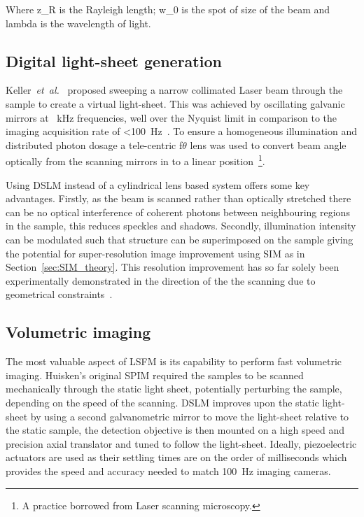 Where \gls{z_R} is the \gls{Rayleigh length}; \gls{w_0} is the spot of size of the beam and \gls{lambda} is the wavelength of light.


\subsection{Digital \gls{light-sheet} generation}

Keller~\emph{et~al.}~\cite{keller_quantitative_2008} proposed sweeping a narrow collimated \gls{Laser} beam through the sample to create a \gls{virtual light-sheet}.
This was achieved by oscillating galvanic mirrors at \SI{}{\kilo\hertz} frequencies, well over the Nyquist limit in comparison to the imaging acquisition rate of \SI{<100}{\hertz}~\cite{keller_quantitative_2008}.
To ensure a homogeneous illumination and distributed photon dosage a \gls{tele-centric} f$\theta$ lens was used to convert beam angle optically from the scanning mirrors in to a linear position~\footnote{A practice borrowed from \gls{Laser} scanning microscopy.}.

Using \gls{DSLM} instead of a cylindrical lens based system offers some key advantages.
Firstly, as the beam is scanned rather than optically stretched there can be no optical interference of coherent photons between neighbouring regions in the sample, this reduces speckles and shadows.
Secondly, illumination intensity can be modulated such that structure can be superimposed on the sample giving the potential for \gls{super-resolution} image improvement using \gls{SIM} as in Section~\ref{sec:SIM_theory}.
This resolution improvement has so far solely been experimentally demonstrated in the direction of the the scanning due to geometrical constraints~\cite{chen_lattice_2014}.

\subsection{Volumetric imaging}

The most valuable aspect of \gls{LSFM} is its capability to perform fast volumetric imaging.
Huisken's original \gls{SPIM} required the samples to be scanned mechanically through the static light sheet, potentially perturbing the sample, depending on the speed of the scanning.
\gls{DSLM} improves upon the static \gls{light-sheet} by using a second galvanometric mirror to move the \gls{light-sheet} relative to the static sample, the detection objective is then mounted on a high speed and precision axial translator and tuned to follow the \gls{light-sheet}.
Ideally, piezoelectric actuators are used as their settling times are on the order of milliseconds which provides the speed and accuracy needed to match \SI{100}{\hertz} imaging cameras.

